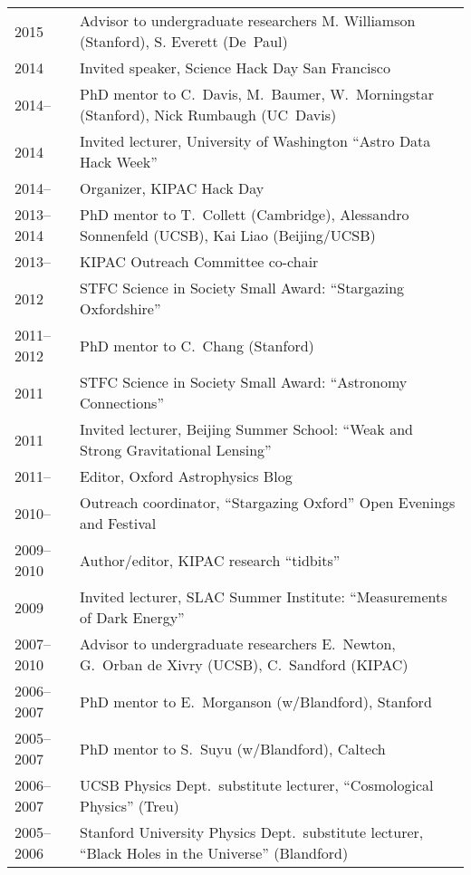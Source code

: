 \noindent
\begin{tabular}{@{}p{2.5cm}p{15.5cm}}
2015        & Advisor to undergraduate researchers M. Williamson (Stanford), S. Everett (De~Paul)\\
2014        & Invited speaker, Science Hack Day San Francisco\\
2014--      & PhD mentor to C.~Davis, M.~Baumer, W.~Morningstar (Stanford), Nick Rumbaugh (UC~Davis)\\
2014        & Invited lecturer, University of Washington ``Astro Data Hack Week''\\
2014--      & Organizer, KIPAC Hack Day \\
2013--2014  & PhD mentor to T.~Collett (Cambridge), Alessandro Sonnenfeld (UCSB), Kai Liao (Beijing/UCSB)\\
2013--      & KIPAC Outreach Committee co-chair \\
2012        & STFC Science in Society Small Award: ``Stargazing Oxfordshire''\\
2011--2012  & PhD mentor to C.~Chang (Stanford) \\
2011        & STFC Science in Society Small Award: ``Astronomy Connections''\\
2011        & Invited lecturer, Beijing Summer School: ``Weak and Strong Gravitational Lensing''\\
2011--      & Editor, Oxford Astrophysics Blog\\
2010--      & Outreach coordinator, ``Stargazing Oxford'' Open Evenings and Festival\\
2009--2010  & Author/editor, KIPAC research ``tidbits''\\
2009        & Invited lecturer, SLAC Summer Institute: ``Measurements of Dark Energy''\\
2007--2010  & Advisor to undergraduate researchers E.~Newton, G.~Orban de Xivry (UCSB), C.\ Sandford (KIPAC)\\
2006--2007  & PhD mentor to E.~Morganson (w/Blandford), Stanford\\
2005--2007  & PhD mentor to S.~Suyu (w/Blandford), Caltech\\
2006--2007  & UCSB Physics Dept.\ substitute lecturer, ``Cosmological Physics'' (Treu)\\
2005--2006  & Stanford University Physics Dept.\ substitute lecturer, ``Black Holes in the Universe'' (Blandford)\\

\end{tabular}
